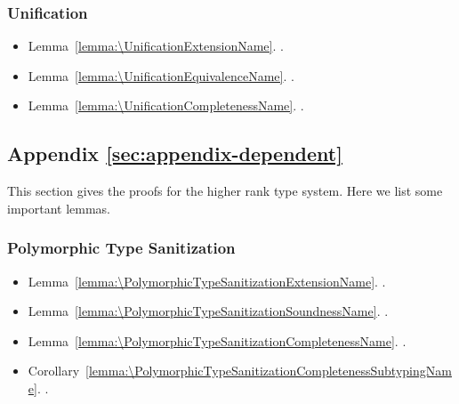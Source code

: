 \subsubsection{Unification}
\begin{itemize}
\item Lemma~\ref{lemma:\UnificationExtensionName}.
  \UnificationExtensionName.\\
  \UnificationExtensionBody
\item Lemma~\ref{lemma:\UnificationEquivalenceName}.
  \UnificationEquivalenceName.\\
  \UnificationEquivalenceBody
\item Lemma~\ref{lemma:\UnificationCompletenessName}.
  \UnificationCompletenessName.\\
  \UnificationCompletenessBody
\end{itemize}

\subsection{Appendix \ref{sec:appendix-dependent}}

This section gives the proofs for the higher rank type system.
Here we list some important lemmas.

\subsubsection{Polymorphic Type Sanitization}

\begin{itemize}
\item Lemma~\ref{lemma:\PolymorphicTypeSanitizationExtensionName}.
  \PolymorphicTypeSanitizationExtensionName.\\
  \PolymorphicTypeSanitizationExtensionBody
\item Lemma~\ref{lemma:\PolymorphicTypeSanitizationSoundnessName}.
  \PolymorphicTypeSanitizationSoundnessName.\\
  \PolymorphicTypeSanitizationSoundnessBody
\item Lemma~\ref{lemma:\PolymorphicTypeSanitizationCompletenessName}.
  \PolymorphicTypeSanitizationCompletenessName.\\
  \PolymorphicTypeSanitizationCompletenessBody
\item Corollary~\ref{lemma:\PolymorphicTypeSanitizationCompletenessSubtypingName}.
  \PolymorphicTypeSanitizationCompletenessSubtypingName.\\
  \PolymorphicTypeSanitizationCompletenessSubtypingBody
\end{itemize}

